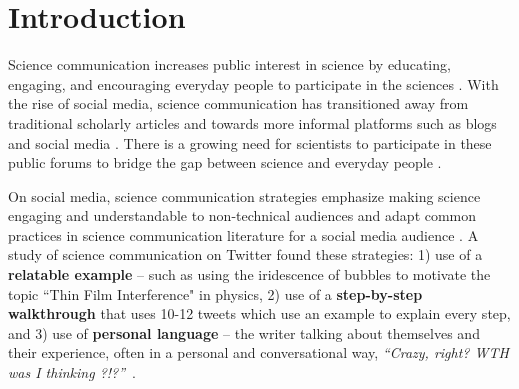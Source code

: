 \section{Introduction}


Science communication increases public interest in science by educating, engaging, and encouraging everyday people to participate in the sciences \cite{national2017communicating, burns2003science}. With the rise of social media, science communication has transitioned away from traditional scholarly articles and towards more informal platforms such as blogs and social media \cite{hou2017hacking, williams2022hci, bruggemann2020post}. There is a growing need for scientists to participate in these public forums to bridge the gap between science and everyday people \cite{pearson2001participation, powell2008building}. 


On social media, science communication strategies emphasize making science engaging and understandable to non-technical audiences and adapt common practices in science communication literature for a social media audience \cite{gilbert2020run}. A study of science communication on Twitter found these strategies: 1) use of a \textbf{relatable example} -- such as using the iridescence of bubbles to motivate the topic ``Thin Film Interference" in physics, 2) use of a \textbf{step-by-step walkthrough} that uses 10-12 tweets which use an example to explain every step, and 3) use of \textbf{personal language} -- the writer talking about themselves and their experience, often in a personal and conversational way, \textit{``Crazy, right? WTH was I thinking ?!?''}~\cite{gero2021makes}. 

